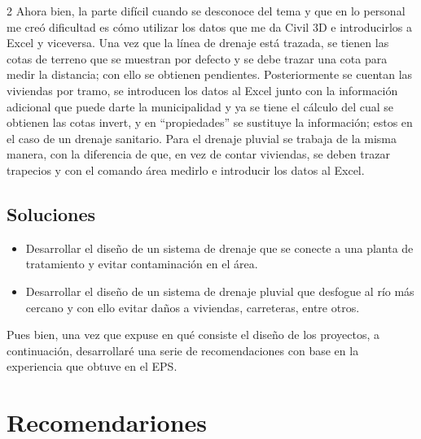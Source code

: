 \documentclass[12pt,spanish,Letterpaper,openany]{book}
\providecommand{\tightlist}{%
  \setlength{\itemsep}{0pt}\setlength{\parskip}{0pt}}
\begin{document}
\begin {multicols}{2}
Ahora bien, la parte difícil cuando se desconoce del tema y que en lo personal me creó dificultad es cómo utilizar los datos que me da Civil 3D e introducirlos a Excel y viceversa. Una vez que la línea de drenaje está trazada, se tienen las cotas de terreno que se muestran por defecto y se debe trazar una cota para medir la distancia; con ello se obtienen pendientes. Posteriormente se cuentan las viviendas por tramo, se introducen los datos al Excel junto con la información adicional que puede darte la municipalidad y ya se tiene el cálculo del cual se obtienen las cotas invert, y en ``propiedades'' se sustituye la información; estos en el caso de un drenaje sanitario. Para el drenaje pluvial se trabaja de la misma manera, con la diferencia de que, en vez de contar viviendas, se deben trazar trapecios y con el comando área medirlo e introducir los datos al Excel.

\hypertarget{soluciones}{%
\subsection{Soluciones}\label{soluciones}}

\begin{itemize}
\tightlist
\item
  Desarrollar el diseño de un sistema de drenaje que se conecte a una planta de tratamiento y evitar contaminación en el área.
\item
  Desarrollar el diseño de un sistema de drenaje pluvial que desfogue al río más cercano y con ello evitar daños a viviendas, carreteras, entre otros.
\end{itemize}

Pues bien, una vez que expuse en qué consiste el diseño de los proyectos, a continuación, desarrollaré una serie de recomendaciones con base en la experiencia que obtuve en el EPS.

\hypertarget{recomendariones}{%
\section{Recomendariones}\label{recomendariones}}


\end{multicols}
\end{document}
